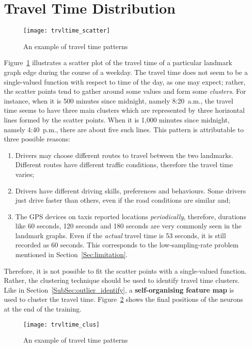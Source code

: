 \section{Travel Time Distribution}
\begin{figure}[h!]
\texttt{[image: trvltime\_scatter]}
\centering
\caption{An example of travel time patterns}\label{Fig:wrkd_50m_trvltime}
\end{figure}

Figure~\ref{Fig:wrkd_50m_trvltime} illustrates a scatter plot of the travel time of a particular landmark graph edge during the course of a weekday. The travel time does not seem to be a single-valued function with respect to time of the day, as one may expect; rather, the scatter points tend to gather around some values and form some \emph{clusters}. For instance, when it is 500 minutes since midnight, namely 8:20~a.m., the travel time seems to have three main clusters which are represented by three horizontal lines formed by the scatter points. When it is 1,000 minutes since midnight, namely 4:40~p.m., there are about five such lines. This pattern is attributable to three possible reasons:
\begin{enumerate}
\item Drivers may choose different routes to travel between the two landmarks. Different routes have different traffic conditions, therefore the travel time varies;
\item Drivers have different driving skills, preferences and behaviours. Some drivers just drive faster than others, even if the road conditions are similar and;
\item The GPS devices on taxis reported locations \emph{periodically}, therefore, durations like 60 seconds, 120 seconds and 180 seconds are very commonly seen in the landmark graphs. Even if the \emph{actual} travel time is 53 seconds, it is still recorded as 60 seconds. This corresponds to the low-sampling-rate problem mentioned in Section~\ref{Sec:limitation}. 
\end{enumerate}

Therefore, it is not possible to fit the scatter points with a single-valued function. Rather, the clustering technique should be used to identify travel time clusters. Like in Section~\ref{SubSec:outlier_identify}, a \textbf{self-organising feature map} is used to cluster the travel time. Figure~\ref{Fig:trvltime_clus} shows the final positions of the neurons at the end of the training.

\begin{figure}[h!]
\texttt{[image: trvltime\_clus]}
\centering
\caption{An example of travel time patterns}\label{Fig:trvltime_clus}
\end{figure}

